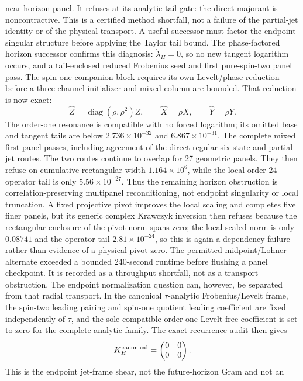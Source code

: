 \documentclass[11pt]{article}
\theoremstyle{definition}
\theoremstyle{remark}
\begin{document}
near-horizon panel.  It refuses at its analytic-tail gate: the direct
majorant is noncontractive.  This is a certified method shortfall, not a
failure of the partial-jet identity or of the physical transport.  A useful
successor must factor the endpoint singular structure before applying the
Taylor tail bound.  The phase-factored horizon successor confirms this
diagnosis: \(\dot\lambda_H=0\), so no new tangent logarithm occurs, and a
tail-enclosed reduced Frobenius seed and first pure-spin-two panel pass.  The
spin-one companion block requires its own Levelt/phase reduction before
a three-channel initializer and mixed column are bounded.  That reduction
is now exact:
\[
 \widehat Z=\operatorname{diag}(\rho,\rho^2)Z,\qquad
 \widehat X=\rho X,\qquad \widehat Y=\rho Y.
\]
The order-one resonance is compatible with no forced logarithm; its omitted
base and tangent tails are below \(2.736\times10^{-32}\) and
\(6.867\times10^{-31}\).  The complete mixed first panel passes, including
agreement of the direct regular six-state and partial-jet routes.  The two
routes continue to overlap for 27 geometric panels.  They then refuse on
cumulative rectangular width \(1.164\times10^6\), while the local
order-24 operator tail is only \(5.56\times10^{-27}\).  Thus the remaining
horizon obstruction is correlation-preserving multipanel reconditioning,
not endpoint singularity or local truncation.  A fixed projective pivot
improves the local scaling and completes five finer panels, but its generic
complex Krawczyk inversion then refuses because the rectangular enclosure of
the pivot norm spans zero; the local scaled norm is only \(0.08741\) and the
operator tail \(2.81\times10^{-24}\), so this is again a dependency failure
rather than evidence of a physical pivot zero.  The permitted
midpoint/Lohner alternate exceeded a bounded 240-second runtime before
flushing a panel checkpoint.  It is recorded as a throughput shortfall, not
as a transport obstruction.  The endpoint normalization question can,
however, be separated from that radial transport.  In the canonical
\(\tau\)-analytic Frobenius/Levelt frame, the spin-two leading pairing and
spin-one quotient leading coefficient are fixed independently of \(\tau\),
and the sole compatible order-one Levelt free coefficient is set to zero
for the complete analytic family.  The exact recurrence audit then gives
\[
 K_H^{\rm canonical}=
 \begin{pmatrix}0&0\\0&0\end{pmatrix}.
\]
This is the endpoint jet-frame shear, not the future-horizon Gram and not an
\end{document}
